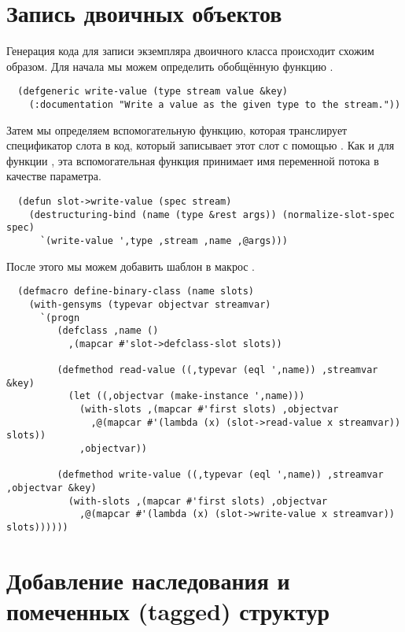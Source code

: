 \section{Запись двоичных объектов}

Генерация кода для записи экземпляра двоичного класса происходит схожим образом. Для
начала мы можем определить обобщённую функцию .

\begin{lstlisting}
  (defgeneric write-value (type stream value &key)
    (:documentation "Write a value as the given type to the stream."))
\end{lstlisting}

Затем мы определяем вспомогательную функцию, которая транслирует спецификатор слота
 в код, который записывает этот слот с помощью
. Как и для функции , эта вспомогательная функция
принимает имя переменной потока в качестве параметра.

\begin{lstlisting}
  (defun slot->write-value (spec stream)
    (destructuring-bind (name (type &rest args)) (normalize-slot-spec spec)
      `(write-value ',type ,stream ,name ,@args)))
\end{lstlisting}

После этого мы можем добавить шаблон  в макрос
.

\begin{lstlisting}
  (defmacro define-binary-class (name slots)
    (with-gensyms (typevar objectvar streamvar)
      `(progn
         (defclass ,name ()
           ,(mapcar #'slot->defclass-slot slots))

         (defmethod read-value ((,typevar (eql ',name)) ,streamvar &key)
           (let ((,objectvar (make-instance ',name)))
             (with-slots ,(mapcar #'first slots) ,objectvar
               ,@(mapcar #'(lambda (x) (slot->read-value x streamvar)) slots))
             ,objectvar))

         (defmethod write-value ((,typevar (eql ',name)) ,streamvar ,objectvar &key)
           (with-slots ,(mapcar #'first slots) ,objectvar
             ,@(mapcar #'(lambda (x) (slot->write-value x streamvar)) slots))))))
\end{lstlisting}

\section{Добавление наследования и помеченных (tagged) структур}

